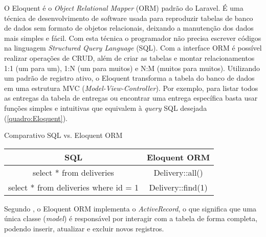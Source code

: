 O Eloquent é o \textit{Object Relational Mapper} (ORM) padrão do Laravel. É uma técnica de desenvolvimento de software usada para reproduzir tabelas de banco de dados sem formato de objetos relacionais, deixando a manutenção dos dados mais simples e fácil. Com esta técnica o programador não precisa escrever códigos na linguagem \textit{Structured Query Language} (SQL). Com a interface ORM é possível realizar operações de CRUD, além de criar as tabelas e montar relacionamentos 1:1 (um para um), 1:N (um para muitos) e N:M (muitos para muitos). Utilizando um padrão de registro ativo, o Eloquent transforma a tabela do banco de dados em uma estrutura MVC (\textit{Model-View-Controller}). Por exemplo, para listar todos as entregas da tabela de entregas ou encontrar uma entrega específica basta usar funções simples e intuitivas que equivalem à \textit{query} SQL desejada (\autoref{quadro:Eloquent}).

\begin{quadro}[H]
    \centering
    \caption{Comparativo SQL vs. Eloquent ORM
    \label{quadro:Eloquent}}
\begin{tabular}{|c|c|}
\hline
\textbf{SQL} & \textbf{Eloquent ORM} \\ \hline
select * from deliveries & Delivery::all() \\ \hline
select * from deliveries where id = 1 & Delivery::find(1) \\ \hline
\end{tabular}
\end{quadro}

Segundo , o Eloquent ORM implementa o \textit{ActiveRecord}, o que significa que uma única classe (\textit{model}) é responsável por interagir com a tabela de forma completa, podendo inserir, atualizar e excluir novos registros.